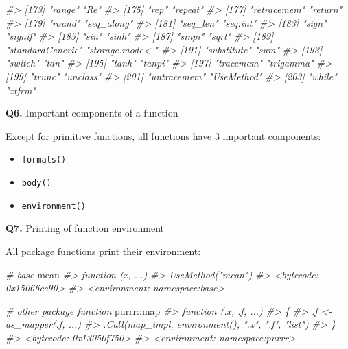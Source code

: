 \documentclass[
]{book}
\newenvironment{Shaded}{\begin{snugshade}}{\end{snugshade}}
\newcommand{\CommentTok}[1]{\textcolor[rgb]{0.56,0.35,0.01}{\textit{#1}}}
\newcommand{\NormalTok}[1]{#1}
\newcommand{\SpecialCharTok}[1]{\textcolor[rgb]{0.00,0.00,0.00}{#1}}
\providecommand{\tightlist}{%
  \setlength{\itemsep}{0pt}\setlength{\parskip}{0pt}}
\begin{document}
\begin{Shaded}
\begin{Highlighting}[]
\CommentTok{\#\textgreater{} [173] "range"                "Re"                  }
\CommentTok{\#\textgreater{} [175] "rep"                  "repeat"              }
\CommentTok{\#\textgreater{} [177] "retracemem"           "return"              }
\CommentTok{\#\textgreater{} [179] "round"                "seq\_along"           }
\CommentTok{\#\textgreater{} [181] "seq\_len"              "seq.int"             }
\CommentTok{\#\textgreater{} [183] "sign"                 "signif"              }
\CommentTok{\#\textgreater{} [185] "sin"                  "sinh"                }
\CommentTok{\#\textgreater{} [187] "sinpi"                "sqrt"                }
\CommentTok{\#\textgreater{} [189] "standardGeneric"      "storage.mode\textless{}{-}"      }
\CommentTok{\#\textgreater{} [191] "substitute"           "sum"                 }
\CommentTok{\#\textgreater{} [193] "switch"               "tan"                 }
\CommentTok{\#\textgreater{} [195] "tanh"                 "tanpi"               }
\CommentTok{\#\textgreater{} [197] "tracemem"             "trigamma"            }
\CommentTok{\#\textgreater{} [199] "trunc"                "unclass"             }
\CommentTok{\#\textgreater{} [201] "untracemem"           "UseMethod"           }
\CommentTok{\#\textgreater{} [203] "while"                "xtfrm"}
\end{Highlighting}
\end{Shaded}

\textbf{Q6.} Important components of a function

Except for primitive functions, all functions have 3 important components:

\begin{itemize}
\tightlist
\item
  \texttt{formals()}
\item
  \texttt{body()}
\item
  \texttt{environment()}
\end{itemize}

\textbf{Q7.} Printing of function environment

All package functions print their environment:

\begin{Shaded}
\begin{Highlighting}[]
\CommentTok{\# base}
\NormalTok{mean}
\CommentTok{\#\textgreater{} function (x, ...) }
\CommentTok{\#\textgreater{} UseMethod("mean")}
\CommentTok{\#\textgreater{} \textless{}bytecode: 0x15066ce90\textgreater{}}
\CommentTok{\#\textgreater{} \textless{}environment: namespace:base\textgreater{}}

\CommentTok{\# other package function}
\NormalTok{purrr}\SpecialCharTok{::}\NormalTok{map}
\CommentTok{\#\textgreater{} function (.x, .f, ...) }
\CommentTok{\#\textgreater{} \{}
\CommentTok{\#\textgreater{}     .f \textless{}{-} as\_mapper(.f, ...)}
\CommentTok{\#\textgreater{}     .Call(map\_impl, environment(), ".x", ".f", "list")}
\CommentTok{\#\textgreater{} \}}
\CommentTok{\#\textgreater{} \textless{}bytecode: 0x13050f750\textgreater{}}
\CommentTok{\#\textgreater{} \textless{}environment: namespace:purrr\textgreater{}}
\end{Highlighting}
\end{Shaded}
\end{document}
